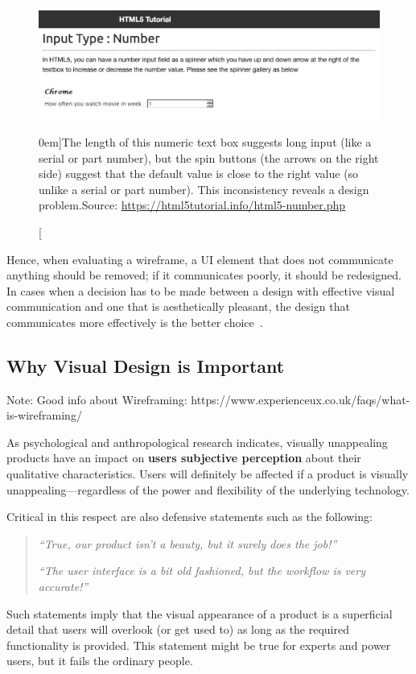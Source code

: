 \begin{figure}%
	\centering
  \includegraphics[width=1.0\textwidth]{../figures/inconsistent_inputfield.png}
  \caption[][0em]{The length of this numeric text box suggests long input (like a serial or part number), but the spin buttons (the arrows on the right side) suggest that the default value is close to the right value (so unlike a serial or part number). This inconsistency reveals a design problem.\newline Source: \url{https://html5tutorial.info/html5-number.php}}
  \label{fig:inconsistent_inputfield}
\end{figure}

Hence, when evaluating a wireframe, a UI element that does not communicate anything should be removed; if it communicates poorly, it should be redesigned. In cases when a decision has to be made between a design with effective visual communication and one that is aesthetically pleasant, the design that communicates more effectively is the better choice~\citep{mckay:2013}. 


\subsection{Why Visual Design is Important} %
\label{sub:why_visual_design_is_important}

Note: Good info about Wireframing: https://www.experienceux.co.uk/faqs/what-is-wireframing/

As psychological and anthropological research indicates, visually unappealing products have an impact on \textbf{users subjective perception} about their qualitative characteristics. 
Users will definitely be affected if a product is visually unappealing---regardless of the power and flexibility of the underlying technology. 

Critical in this respect are also defensive statements such as the following:
\begin{quote}
	\emph{``True, our product isn't a beauty, but it surely does the job!''}
	\par
	\emph{``The user interface is a bit old fashioned, but the workflow is very accurate!''}
\end{quote}
Such statements imply that the visual appearance of a product is a superficial detail that users will overlook (or get used to) as long as the required functionality is provided. 
This statement might be true for experts and power users, but it fails the ordinary people.

